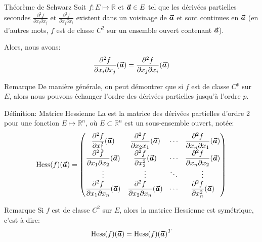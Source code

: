 \documentclass[a4paper]{article}
\begin{document}
\begin{parag}{Théorème de Schwarz}
    Soit $f : E \mapsto \mathbb{R}$ et $\bm{\protect\vec{a}} \in E$ tel que les dérivées partielles secondes $\frac{\partial^2 f}{\partial x_i \partial x_j}$ et $\frac{\partial^2 f}{\partial x_j \partial x_i}$ existent dans un voisinage de $\bm{\protect\vec{a}}$ et sont continues en $\bm{\protect\vec{a}}$ (en d'autres mots, $f$ est de classe $C^2$ sur un ensemble ouvert contenant $\bm{\protect\vec{a}}$).

    Alors, nous avons: 
    \[\frac{\partial^2 f}{\partial x_i \partial x_j}\left(\bvec{a}\right) = \frac{\partial^2 f}{\partial x_j \partial x_i}\left(\bvec{a}\right)\]

    \begin{subparag}{Remarque}
        De manière générale, on peut démontrer que si $f$ est de classe $C^{p}$ sur $E$, alors nous pouvons échanger l'ordre des dérivées partielles jusqu'à l'ordre $p$.
    \end{subparag}
\end{parag}

\begin{parag}{Définition: Matrice Hessienne}
    La  est la matrice des dérivées partielles d'ordre 2 pour une fonction $E \mapsto \mathbb{R}^n$, où $E \subset \mathbb{R}^n$ est un sous-ensemble ouvert, notée: 
    \[\Hess\left(f\right)\left(\bvec{a}\right) = \begin{pmatrix} \dfrac{\partial^2 f}{\partial x_1^2}\left(\bvec{a}\right) & \dfrac{\partial^2 f}{\partial x_2 x_1}\left(\bvec{a}\right) & \cdots & \dfrac{\partial^2 f}{\partial x_n \partial x_1}\left(\bvec{a}\right) \\ \dfrac{\partial^2 f}{\partial x_1 \partial x_2}\left(\bvec{a}\right) & \dfrac{\partial^2 f}{\partial x_2^2}\left(\bvec{a}\right) & \cdots & \dfrac{\partial^2 f}{\partial x_n \partial x_2}\left(\bvec{a}\right) \\ \vdots & \vdots & \ddots  & \vdots \\ \dfrac{\partial^2 f}{\partial x_1 \partial x_n}\left(\bvec{a}\right) & \dfrac{\partial^2 f}{\partial x_2 \partial x_n}\left(\bvec{a}\right) & \cdots & \dfrac{\partial^2 f}{\partial x_n^2}\left(\bvec{a}\right) \end{pmatrix} \]
    
    \begin{subparag}{Remarque}
        Si $f$ est de classe $C^2$ sur $E$, alors la matrice Hessienne est symétrique, c'est-à-dire: 
        \[\Hess\left(f\right)\left(\bvec{a}\right) = \Hess\left(f\right)\left(\bvec{a}\right)^T\]
    \end{subparag}
\end{parag}
\end{document}
